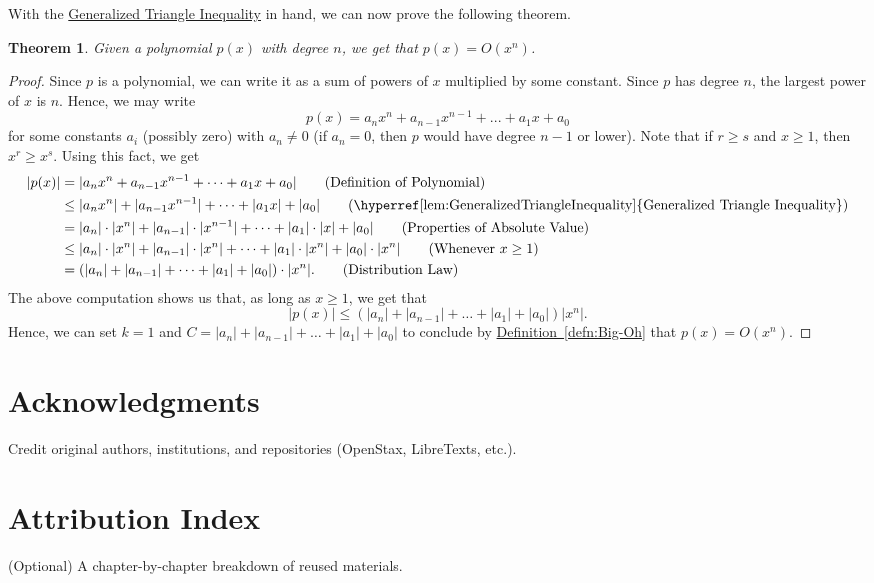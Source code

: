 \documentclass[11pt,oneside]{book}
\newtheorem{thm}{Theorem}[section]
\theoremstyle{definition}
\begin{document}
With the \hyperref[lem:GeneralizedTriangleInequality]{Generalized Triangle Inequality} in hand, we can now prove the following theorem.

\begin{thm} \label{thm:LeadingTermDominates}
    Given a polynomial $p(x)$ with degree $n$, we get that $p(x) = O(x^{n})$.
\end{thm}
\begin{proof}
    Since $p$ is a polynomial, we can write it as a sum of powers of $x$ multiplied by some constant.
    Since $p$ has degree $n$, the largest power of $x$ is $n$.
    Hence, we may write
    \[ p(x) = a_{n}x^{n} + a_{n - 1}x^{n - 1} + ... + a_{1}x + a_{0} \]
    for some constants $a_{i}$ (possibly zero) with $a_{n} \neq 0$ (if $a_{n} = 0$, then $p$ would have degree $n - 1$ or lower).
    Note that if $r \geq s$ and $x \geq 1$, then $x^{r} \geq x^{s}$.
    Using this fact, we get
    \begin{align}
        |p(x)|
        &= |a_{n}x^{n} + a_{n - 1}x^{n - 1} + \dots + a_{1}x + a_{0}| \tag{Definition of Polynomial} \\
        &\leq |a_{n}x^{n}| + |a_{n - 1}x^{n - 1}| + \dots + |a_{1}x| + |a_{0}| \tag{\hyperref[lem:GeneralizedTriangleInequality]{Generalized Triangle Inequality}} \\
        &= |a_{n}| \cdot |x^{n}| + |a_{n - 1}| \cdot |x^{n - 1}| + \dots + |a_{1}| \cdot |x| + |a_{0}| \tag{Properties of Absolute Value} \\
        &\leq |a_{n}| \cdot |x^{n}| + |a_{n - 1}| \cdot |x^{n}| + \dots + |a_{1}| \cdot |x^{n}| + |a_{0}| \cdot |x^{n}| \tag{Whenever $x \geq 1$} \\
        &= (|a_{n}| + |a_{n - 1}| + \dots + |a_{1}| + |a_{0}|) \cdot |x^{n}|.\tag{Distribution Law}
    \end{align}
    The above computation shows us that, as long as $x \geq 1$, we get that
    \[ |p(x)| \leq (|a_{n}| + |a_{n - 1}| + \dots + |a_{1}| + |a_{0}|)|x^{n}|. \]
    Hence, we can set $k = 1$ and $C = |a_{n}| + |a_{n - 1}| + \dots + |a_{1}| + |a_{0}|$ to conclude by \hyperref[defn:Big-Oh]{Definition~\ref*{defn:Big-Oh}} that $p(x) = O(x^{n})$.
\end{proof}



%
%



\backmatter
\chapter*{Acknowledgments}
Credit original authors, institutions, and repositories (OpenStax, LibreTexts, etc.).



\chapter*{Attribution Index}
(Optional) A chapter-by-chapter breakdown of reused materials.





\end{document}
